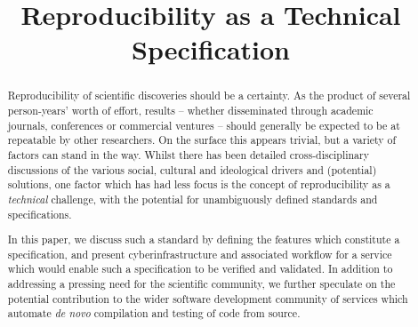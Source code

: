 \documentclass[conference]{IEEEtran}
\begin{document}
%
\title{Reproducibility as a Technical Specification}


\author{
\and
{}
\and
{}
}





\maketitle


\begin{abstract}
Reproducibility of scientific discoveries should be a certainty. As
the product of several person-years' worth of effort, results --
whether disseminated through academic journals, conferences or
commercial ventures -- should generally be expected to be at
repeatable by other researchers. On the surface this appears trivial,
but a variety of factors can stand in the way. Whilst there has been
detailed cross-disciplinary discussions of the various social,
cultural and ideological drivers and (potential) solutions, one factor
which has had less focus is the concept of reproducibility as a
\emph{technical} challenge, with the potential for unambiguously
defined standards and specifications.

In this paper, we discuss such a standard by defining the features
which constitute a specification, and present cyberinfrastructure and
associated workflow for a service which would enable such a
specification to be verified and validated. In addition to addressing
a pressing need for the scientific community, we further speculate on
the potential contribution to the wider software development community
of services which automate \emph{de novo} compilation and testing of
code from source.
\end{abstract}
\end{document}
